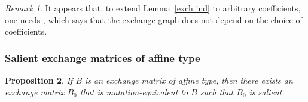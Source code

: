 \documentclass[10pt]{article}
\newtheorem{proposition}{Proposition}[section]
\theoremstyle{definition}
\theoremstyle{remark}
\newtheorem{remark}[proposition]{Remark}
\numberwithin{equation}{section}
\newcommand{\0}{{\mathbf{0}}}
\begin{document}
\begin{remark}\label{4.3}
It appears that, to extend Lemma~\ref{exch ind} to arbitrary coefficients, one needs \cite[Conjecture~4.3]{ca4}, which says that the exchange graph does not depend on the choice of coefficients.
\end{remark}

\subsubsection{Salient exchange matrices of affine type}
\begin{proposition}\label{affine salient}
If $B$ is an exchange matrix of affine type, then there exists an exchange matrix $B_0$ that is mutation-equivalent to $B$ such that $B_0$ is salient.
\end{proposition}
\end{document}

